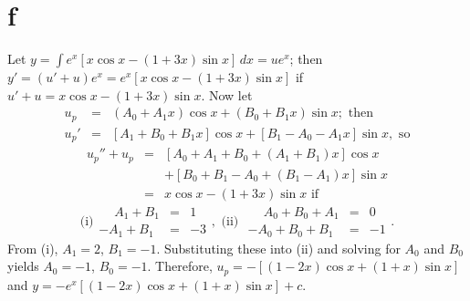 \documentclass[dvips]{book}
\numberwithin{example}{section}
\numberwithin{equation}{section}
\numberwithin{theorem}{section}
\numberwithin{table}{section}
\numberwithin{figure}{section}
\begin{document}
\part{f} Let $y=\int e^x\left[x\cos x-(1+3x)\sin x\right]\,dx=ue^x$;
then $y'=(u'+u)e^x=e^x\left[x\cos x-(1+3x)\sin x\right]$ if
$u'+u=x\cos x-(1+3x)\sin x$. Now let
\begin{eqnarray*}
u_p&=&(A_0+A_1x)\cos x +(B_0+B_1x)\sin x;\mbox{ then}\\
u_p'&=&\left[A_1+B_0+B_1x\right]\cos x
+\left[B_1-A_0-A_1x\right]\sin x,\mbox{ so}
\end{eqnarray*}
\begin{eqnarray*}
u_p''+u_p&=&\left[A_0+A_1+B_0+(A_1+B_1)x\right]\cos x\\ &&
+\left[B_0+B_1-A_0+(B_1-A_1)x\right]\sin x\\ &=&x\cos x-(1+3x)\sin x
\mbox{ if}
\end{eqnarray*}
$$
\mbox{(i)}
\begin{array}{rcr}\phantom{-}A_1+B_1&=&1\\ -A_1+B_1&=&-3
\end{array},
\mbox{ (ii) }
\begin{array}{rcr} \phantom{-}A_0+B_0+A_1&=&0\\ -A_0+B_0+B_1&=&-1
\end{array}.
$$
From (i), $A_1=2$, $B_1=-1$. Substituting
these into (ii) and solving for $A_0$ and $B_0$ yields $A_0=-1$,
$B_0=-1$. Therefore,
 $u_p=-\left[(1-2x)\cos x+(1+x)\sin x\right]$ and
$y=-e^x\left[(1-2x)\cos x+(1+x)\sin x\right]+c$.
\end{document}
